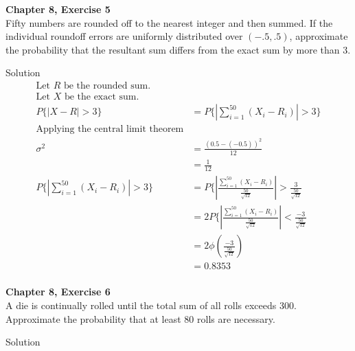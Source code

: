 \documentclass{article}
\begin{document}
\begin{spacing}{1.1}
\newpage
\begin{homeworkProblem}
  {\bf Chapter 8, Exercise 5}\\
  Fifty numbers are rounded off to the nearest integer and then summed. 
  If the individual roundoff errors are uniformly distributed over 
  $(−.5, .5)$, approximate the probability that the resultant sum differs 
  from the exact sum by more than 3.
  \begin{homeworkSection}{Solution}
    \begin{align*}
      \text{Let $R$ be the rounded sum.}\\
      \text{Let $X$ be the exact sum.}\\
      P\{ |X - R| > 3 \} &= P\{ \left|\sum\limits_{i = 1}^{50} (X_i - R_i)\right| > 3\}\\
      \text{Applying the central limit theorem}\\
      \sigma^2 &= \frac{ (0.5 - (- 0.5))^2}{ 12} \\
      &= \frac{ 1}{ 12}\\
      P\{ \left|\sum\limits_{i = 1}^{50} (X_i - R_i)\right| > 3\}
      &= P\{ \left|\frac{ \sum\limits_{i = 1}^{50} (X_i - R_i)}{ \frac{ 50}{ \sqrt{12}}}\right| > \frac{ 3}{ \frac{ 50}{ \sqrt{12}}}\\
      &= 2P\{ \left|\frac{ \sum\limits_{i = 1}^{50} (X_i - R_i)}{ \frac{ 50}{ \sqrt{12}}}\right| < \frac{ -3}{ \frac{ 50}{ \sqrt{12}}}\\
      &= 2 \phi\left( \frac{ -3}{ \frac{ 50}{ \sqrt{12}}}\right)\\
      &= 0.8353\\
    \end{align*}
  \end{homeworkSection}
\end{homeworkProblem}

\newpage
\begin{homeworkProblem}
  {\bf Chapter 8, Exercise 6}\\
  A die is continually rolled until the total sum of all rolls 
  exceeds 300. Approximate the probability that at least 80 rolls 
  are necessary.
  \begin{homeworkSection}{Solution}
    
  \end{homeworkSection}
\end{homeworkProblem}


\end{spacing}
\end{document}
